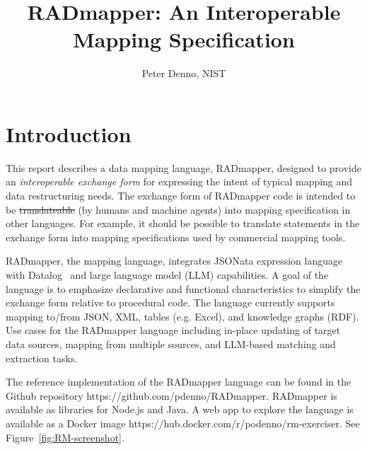 \documentclass[10pt,letterpaper]{article} %
\providecommand{\DIFadd}[1]{{\protect\color{blue}\uwave{#1}}} %
\providecommand{\DIFdel}[1]{{\protect\color{red}\sout{#1}}}                      %
\providecommand{\DIFaddbegin}{} %
\providecommand{\DIFaddend}{} %
\providecommand{\DIFdelbegin}{} %
\providecommand{\DIFdelend}{} %
\newcommand{\DIFscaledelfig}{0.5}
\newlength{\DIFdelgraphicswidth} %
\newlength{\DIFdelgraphicsheight} %
\newcommand{\DIFaddincludegraphics}[2][]{{\color{blue}\fbox{\DIFOincludegraphics[#1]{#2}}}} %
\newcommand{\DIFdelincludegraphics}[2][]{%
\sbox{\DIFdelgraphicsbox}{\DIFOincludegraphics[#1]{#2}}%
\settoboxwidth{\DIFdelgraphicswidth}{\DIFdelgraphicsbox} %
\settoboxtotalheight{\DIFdelgraphicsheight}{\DIFdelgraphicsbox} %
\scalebox{\DIFscaledelfig}{%
\parbox[b]{\DIFdelgraphicswidth}{\usebox{\DIFdelgraphicsbox}\\[-\baselineskip] \rule{\DIFdelgraphicswidth}{0em}}\llap{\resizebox{\DIFdelgraphicswidth}{\DIFdelgraphicsheight}{%
\setlength{\unitlength}{\DIFdelgraphicswidth}%
\begin{picture}(1,1)%
\thicklines\linethickness{2pt} %
{\color[rgb]{1,0,0}\put(0,0){\framebox(1,1){}}}%
{\color[rgb]{1,0,0}\put(0,0){\line( 1,1){1}}}%
{\color[rgb]{1,0,0}\put(0,1){\line(1,-1){1}}}%
\end{picture}%
}\hspace*{3pt}}} %
} %
\DeclareRobustCommand{\DIFaddbegin}{\DIFOaddbegin \let\includegraphics\DIFaddincludegraphics} %
\DeclareRobustCommand{\DIFaddend}{\DIFOaddend \let\includegraphics\DIFOincludegraphics} %
\DeclareRobustCommand{\DIFdelbegin}{\DIFOdelbegin \let\includegraphics\DIFdelincludegraphics} %
\DeclareRobustCommand{\DIFdelend}{\DIFOaddend \let\includegraphics\DIFOincludegraphics} %
\begin{document}
\title{RADmapper: An Interoperable Mapping Specification}
\author{Peter Denno, NIST}
\date{} %
\maketitle{}

\section{Introduction}
This report describes a data mapping language, RADmapper, designed to provide an \textit{interoperable exchange form} for expressing the intent of typical mapping and data restructuring needs.
The exchange form of RADmapper code is intended to be \DIFdelbegin \DIFdel{translateable }\DIFdelend \DIFaddbegin \DIFadd{translatable }\DIFaddend (by humans and machine agents) into mapping specification in other languages.
For example, it should be possible to translate statements in the exchange form into mapping specifications used by commercial mapping tools.

RADmapper, the mapping language, integrates JSONata expression language~\cite{Jsonata.org2021} with Datalog~\cite{Abiteboul1995a} and large language model (LLM) capabilities.
A goal of the language is to emphasize declarative and functional characteristics to simplify the exchange form relative to procedural code.
The language currently supports mapping to/from JSON, XML, tables (e.g. Excel), and knowledge graphs (RDF).
Use cases for the RADmapper language including in-place updating of target data sources, mapping from multiple sources, and LLM-based matching and extraction tasks.

\begin{sloppypar} %
  The reference implementation of the RADmapper language can be found in the Github repository https://github.com/pdenno/RADmapper.
  RADmapper is available as libraries for Node.js and Java.
A web app to explore the language is available as a Docker image https://hub.docker.com/r/podenno/rm-exerciser.
See Figure~\ref{fig:RM-screenshot}.
\end{sloppypar}
\end{document}
